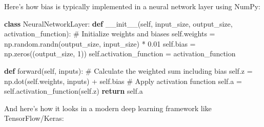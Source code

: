\documentclass[
  letterpaper,
  DIV=11,
  numbers=noendperiod]{scrreprt}
\newenvironment{Shaded}{\begin{snugshade}}{\end{snugshade}}
\newcommand{\CommentTok}[1]{\textcolor[rgb]{0.37,0.37,0.37}{#1}}
\newcommand{\ControlFlowTok}[1]{\textcolor[rgb]{0.00,0.23,0.31}{\textbf{#1}}}
\newcommand{\DecValTok}[1]{\textcolor[rgb]{0.68,0.00,0.00}{#1}}
\newcommand{\FloatTok}[1]{\textcolor[rgb]{0.68,0.00,0.00}{#1}}
\newcommand{\FunctionTok}[1]{\textcolor[rgb]{0.28,0.35,0.67}{#1}}
\newcommand{\KeywordTok}[1]{\textcolor[rgb]{0.00,0.23,0.31}{\textbf{#1}}}
\newcommand{\NormalTok}[1]{\textcolor[rgb]{0.00,0.23,0.31}{#1}}
\newcommand{\OperatorTok}[1]{\textcolor[rgb]{0.37,0.37,0.37}{#1}}
\newcommand{\VariableTok}[1]{\textcolor[rgb]{0.07,0.07,0.07}{#1}}
\begin{document}
Here's how bias is typically implemented in a neural network layer using
NumPy:

\begin{Shaded}
\begin{Highlighting}[]
\KeywordTok{class}\NormalTok{ NeuralNetworkLayer:}
    \KeywordTok{def} \FunctionTok{\_\_init\_\_}\NormalTok{(}\VariableTok{self}\NormalTok{, input\_size, output\_size, activation\_function):}
        \CommentTok{\# Initialize weights and biases}
        \VariableTok{self}\NormalTok{.weights }\OperatorTok{=}\NormalTok{ np.random.randn(output\_size, input\_size) }\OperatorTok{*} \FloatTok{0.01}
        \VariableTok{self}\NormalTok{.bias }\OperatorTok{=}\NormalTok{ np.zeros((output\_size, }\DecValTok{1}\NormalTok{))}
        \VariableTok{self}\NormalTok{.activation\_function }\OperatorTok{=}\NormalTok{ activation\_function}
    
    \KeywordTok{def}\NormalTok{ forward(}\VariableTok{self}\NormalTok{, inputs):}
        \CommentTok{\# Calculate the weighted sum including bias}
        \VariableTok{self}\NormalTok{.z }\OperatorTok{=}\NormalTok{ np.dot(}\VariableTok{self}\NormalTok{.weights, inputs) }\OperatorTok{+} \VariableTok{self}\NormalTok{.bias}
        \CommentTok{\# Apply activation function}
        \VariableTok{self}\NormalTok{.a }\OperatorTok{=} \VariableTok{self}\NormalTok{.activation\_function(}\VariableTok{self}\NormalTok{.z)}
        \ControlFlowTok{return} \VariableTok{self}\NormalTok{.a}
\end{Highlighting}
\end{Shaded}

And here's how it looks in a modern deep learning framework like
TensorFlow/Keras:
\end{document}
